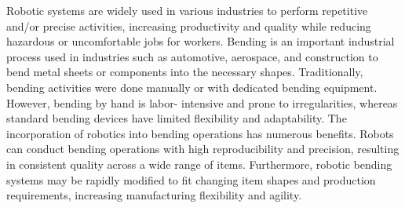 Robotic systems \cite{goossens1993} are widely used in various industries to perform repetitive
and/or precise activities, increasing productivity and quality while reducing
hazardous or uncomfortable jobs for workers.
Bending is an important industrial process used in industries such as
automotive, aerospace, and construction to bend metal sheets or components
into the necessary shapes. Traditionally, bending activities were done manually
or with dedicated bending equipment. However, bending by hand is labor-
intensive and prone to irregularities, whereas standard bending devices have
limited flexibility and adaptability.
The incorporation of robotics into bending operations has numerous benefits.
Robots can conduct bending operations with high reproducibility and precision,
resulting in consistent quality across a wide range of items. Furthermore, robotic
bending systems may be rapidly modified to fit changing item shapes and
production requirements, increasing manufacturing flexibility and agility.
